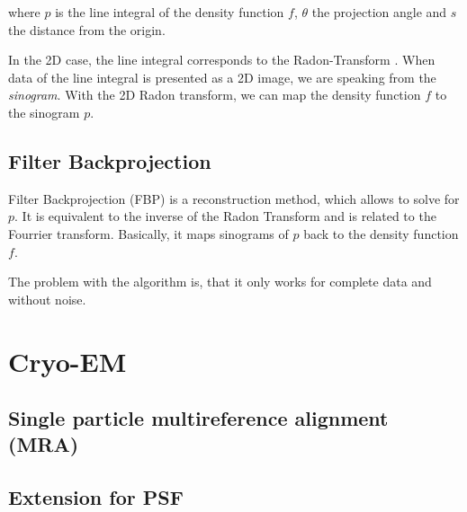 where $p$ is the line integral of the density function $f$, $\theta$ the projection angle and $s$ the distance from the origin.

In the 2D case, the line integral corresponds to the Radon-Transform \cite{radonTransform}.
When data of the line integral is presented as a 2D image, we are speaking from the \textit{sinogram}.
With the 2D Radon transform, we can map the density function $f$ to the sinogram $p$. 


\subsection{Filter Backprojection}
\label{sec:filterBackProjection}
Filter Backprojection (FBP) is a reconstruction method, which allows to solve for $p$. It is equivalent to the inverse of the Radon Transform
and is related to the Fourrier transform. Basically, it maps sinograms of $p$ back to the density function $f$.

The problem with the algorithm is, that it only works for complete data and without noise.



\section{Cryo-EM}


\subsection{Single particle multireference alignment (MRA)}


\subsection{Extension for PSF}

